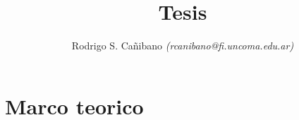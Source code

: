 \documentclass[a4paper]{report}
\title{Tesis}
\author{Rodrigo S. Cañibano \emph{(rcanibano@fi.uncoma.edu.ar)}}
\begin{document}
\maketitle

\chapter{Marco teorico}








\end{document}
